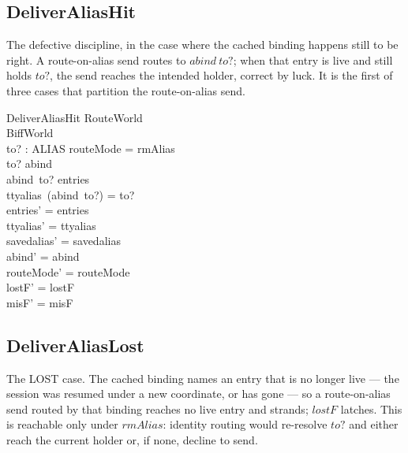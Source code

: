 \documentclass[a4paper,10pt,fleqn]{article}
\begin{document}
\subsection{DeliverAliasHit}

The defective discipline, in the case where the cached binding happens
still to be right.  A route-on-alias send routes to $abind~to?$; when
that entry is live and still holds $to?$, the send reaches the intended
holder, correct by luck.  It is the first of three cases that partition
the route-on-alias send.

\begin{schema}{DeliverAliasHit}
  \Delta RouteWorld \\
  \Xi BiffWorld \\
  to? : ALIAS
  \where
  routeMode = rmAlias \\
  to? \in \dom abind \\
  abind~to? \in entries \\
  ttyalias~(abind~to?) = to? \\
  entries' = entries \\
  ttyalias' = ttyalias \\
  savedalias' = savedalias \\
  abind' = abind \\
  routeMode' = routeMode \\
  lostF' = lostF \\
  misF' = misF
\end{schema}

\subsection{DeliverAliasLost}

The LOST case.  The cached binding names an entry that is no longer live
--- the session was resumed under a new coordinate, or has gone --- so a
route-on-alias send routed by that binding reaches no live entry and
strands; $lostF$ latches.  This is reachable only under $rmAlias$:
identity routing would re-resolve $to?$ and either reach the current
holder or, if none, decline to send.
\end{document}

